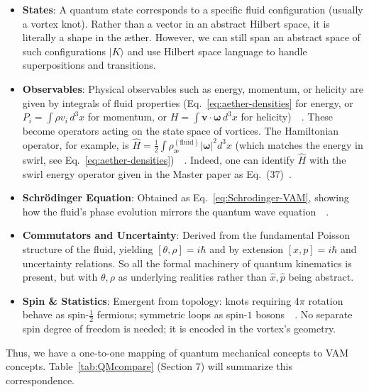 \documentclass[a4paper,12pt]{article}
\begin{document}
    \begin{itemize}
        \item \textbf{States}: A quantum state corresponds to a specific fluid configuration (usually a vortex knot). Rather than a vector in an abstract Hilbert space, it is literally a shape in the æther. However, we can still span an abstract space of such configurations $|K\rangle$ and use Hilbert space language to handle superpositions and transitions.
        \item \textbf{Observables}: Physical observables such as energy, momentum, or helicity are given by integrals of fluid properties (Eq.~\ref{eq:aether-densities} for energy, or $P_i = \int \rho v_i\,d^3x$ for momentum, or $H=\int \mathbf{v}\cdot\boldsymbol{\omega}\,d^3x$ for helicity)~\cite{reference_85}~\cite{reference_86}. These become operators acting on the state space of vortices. The Hamiltonian operator, for example, is $\hat{H} = \frac{1}{2}\int \rho_{\text{\ae}}^{(\text{fluid})} |\boldsymbol{\omega}|^2 d^3x$ (which matches the energy in swirl, see Eq.~\ref{eq:aether-densities})~\cite{reference_87}~\cite{reference_88}. Indeed, one can identify $\hat{H}$ with the swirl energy operator given in the Master paper as Eq.~(37)~\cite{reference_89}.
        \item \textbf{Schrödinger Equation}: Obtained as Eq.~\eqref{eq:Schrodinger-VAM}, showing how the fluid’s phase evolution mirrors the quantum wave equation~\cite{reference_90}~\cite{reference_91}.
        \item \textbf{Commutators and Uncertainty}: Derived from the fundamental Poisson structure of the fluid, yielding $[\theta, \rho] = i\hbar$ and by extension $[x,p]=i\hbar$ and uncertainty relations. So all the formal machinery of quantum kinematics is present, but with $\theta,\rho$ as underlying realities rather than $\hat{x},\hat{p}$ being abstract.
        \item \textbf{Spin \& Statistics}: Emergent from topology: knots requiring $4\pi$ rotation behave as spin-$\frac{1}{2}$ fermions; symmetric loops as spin-$1$ bosons~\cite{reference_92}~\cite{reference_93}. No separate spin degree of freedom is needed; it is encoded in the vortex's geometry.
    \end{itemize}
    Thus, we have a one-to-one mapping of quantum mechanical concepts to VAM concepts. Table~\ref{tab:QMcompare} (Section 7) will summarize this correspondence.
\end{document}
